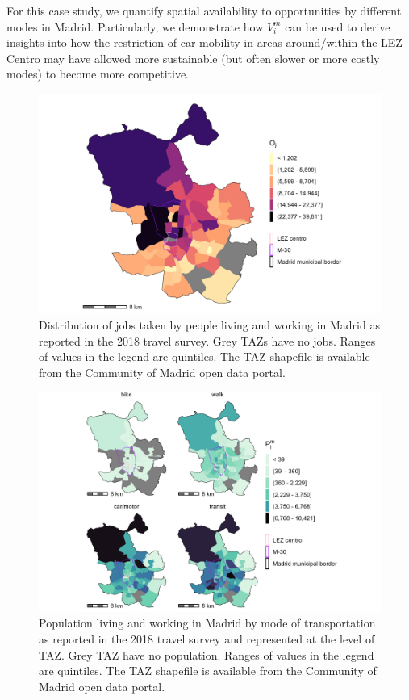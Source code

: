 \documentclass[10pt,letterpaper]{article}
\begin{document}
For this case study, we quantify spatial availability to opportunities
by different modes in Madrid. Particularly, we demonstrate how \(V_i^m\)
can be used to derive insights into how the restriction of car mobility
in areas around/within the LEZ Centro may have allowed more sustainable
(but often slower or more costly modes) to become more competitive.

\begin{figure}

{\centering \includegraphics[width=0.85\linewidth]{images/Fig2} 

}

\caption{\label{fig:Fig2} Distribution of jobs taken by people living and working in Madrid as reported in the 2018 travel survey. Grey TAZs have no jobs. Ranges of values in the legend are quintiles. The TAZ shapefile is available from the Community of Madrid open data portal.}\label{fig:jobs-plot}
\end{figure}

\begin{figure}

{\centering \includegraphics[width=0.85\linewidth]{images/Fig3} 

}

\caption{\label{fig:Fig3} Population living and working in Madrid by mode of transportation as reported in the 2018 travel survey and represented at the level of TAZ. Grey TAZ have no population. Ranges of values in the legend are quintiles. The TAZ shapefile is available from the Community of Madrid open data portal.}\label{fig:pop-plot}
\end{figure}
\end{document}
